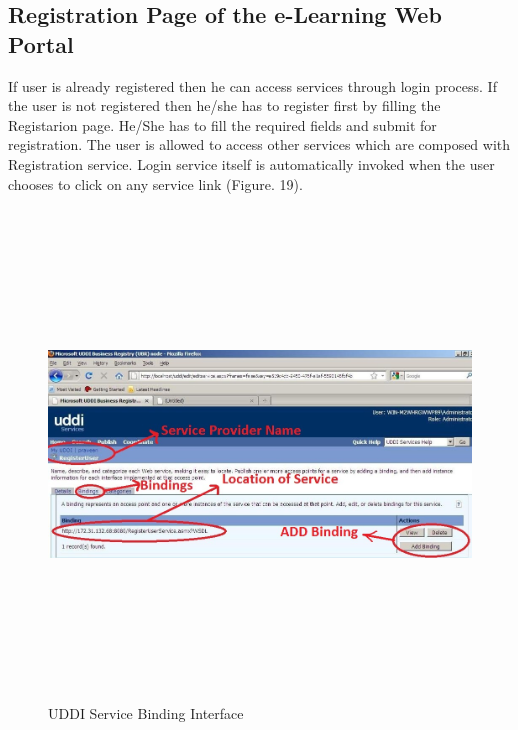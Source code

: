 \subsection{Registration Page of the e-Learning Web Portal}
If user is already registered then he can access services through login process. If the user is not registered  then he/she has to register first by
filling the Registarion page. He/She has to fill the required fields and submit for registration. 
The user is allowed to access other services which are composed with 
Registration service. Login service itself is automatically invoked when the user chooses to click on any service link (Figure. 19).
\begin{figure}[h!]
 \centering
 \includegraphics[width=16cm,height=13cm]{uddi_service_binding_interface.jpg}
 \caption{UDDI Service Binding Interface}
\end{figure}
